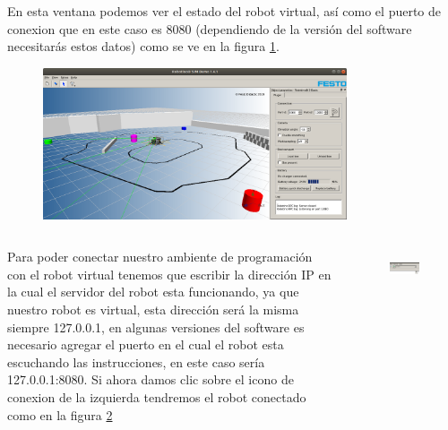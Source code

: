 \begin{frame}
	En esta ventana podemos ver el estado del robot virtual, así como el puerto de conexion que en este caso es 8080 (dependiendo de la versión del software necesitarás estos datos) como se ve en la figura \ref{fig:conexion-03}.

	\begin{figure}
		\begin{center}
			\includegraphics[width=0.8\textwidth]{images/01-conexion/03.png}
			\label{fig:conexion-03}
		\end{center}
	\end{figure}
\end{frame}

\begin{frame}
	\begin{columns}
		Para poder conectar nuestro ambiente de programación con el robot virtual tenemos que escribir la dirección IP en la cual el servidor del robot esta funcionando, ya que nuestro robot es virtual, esta dirección será la misma siempre 127.0.0.1, en algunas versiones del software es necesario agregar el puerto en el cual el robot esta escuchando las instrucciones, en este caso sería 127.0.0.1:8080. Si ahora damos clic sobre el icono de conexion de la izquierda tendremos el robot conectado como en la figura \ref{fig:conexion-05}

		\begin{figure}
			\begin{center}
				\includegraphics[width=0.9\textwidth]{images/01-conexion/06.png}
				\label{fig:conexion-05}
			\end{center}
		\end{figure}
	\end{columns}
\end{frame}

